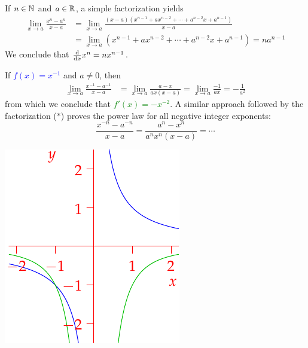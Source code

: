 \begin{examples}{}{}
\exstart If $n\in\mathbb{N}$ and $a\in\mathbb{R}$, a simple factorization yields
\begin{align*}
	\lim_{x\to a}\frac{x^n-a^n}{x-a}&=\lim_{x\to a}\frac{(x-a)(x^{n-1}+ax^{n-2}+\cdots +a^{n-2}x+a^{n-1})}{x-a}\tag{$\ast$}\\
	&=\lim_{x\to a}(x^{n-1}+ax^{n-2}+\cdots +a^{n-2}x+a^{n-1}) =na^{n-1}
	\end{align*}
We conclude that $\frac{\mathrm{d} }{\mathrm{d} x} x^n=nx^{n-1}$.
\begin{enumerate}\setcounter{enumi}{1}
	\begin{minipage}[t]{0.7\linewidth}\vspace{0pt}
		\item If \textcolor{blue}{$f(x)=x^{-1}$} and $a\neq 0$, then
		\begin{align*}
			\lim_{x\to a}\frac{x^{-1}-a^{-1}}{x-a}&=\lim_{x\to a}\frac{a-x}{ax(x-a)} =\lim_{x\to a}\frac{-1}{ax}=-\frac 1{a^2}
		\end{align*}
		from which we conclude that \textcolor{Green}{$f'(x)=-x^{-2}$}.\smallbreak
		A similar approach followed by the factorization ($\ast$) proves the power law for all 	negative integer exponents:
		\[\frac{x^{-n}-a^{-n}}{x-a}=\frac{a^n-x^n}{a^nx^n(x-a)}=\cdots\]
	\end{minipage}\begin{minipage}[t]{0.3\linewidth}\vspace{-10pt}
		\flushright\includegraphics[scale=0.9]{diff-exneg2}
	\end{minipage}\bigbreak



\end{enumerate}
\end{examples}
